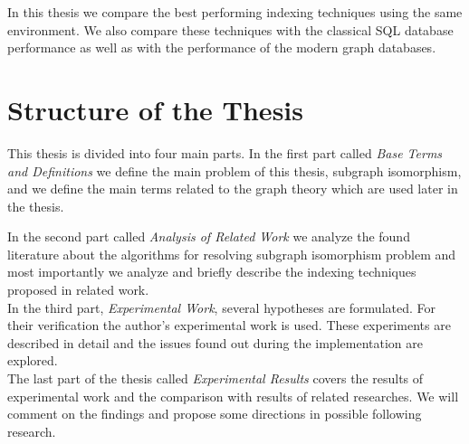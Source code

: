 In this thesis we compare the best performing indexing techniques using the same environment. We also compare these techniques with the classical SQL database performance as well as with the performance of the modern graph databases.


\section*{Structure of the Thesis}

This thesis is divided into four main parts. In the first part called \textit{Base Terms and Definitions} we define the main problem of this thesis, subgraph isomorphism, and we define the main terms related to the graph theory which are used later in the thesis.

In the second part called \textit{Analysis of Related Work} we analyze the found literature about the algorithms for resolving subgraph isomorphism problem and most importantly we analyze and briefly describe the indexing techniques proposed in related work.\\

In the third part, \textit{Experimental Work}, several hypotheses are formulated. For their verification the author’s experimental work is used. These experiments are described in detail and the issues found out during the implementation are explored.\\

The last part of the thesis called \textit{Experimental Results} covers the results of experimental work and the comparison with results of related researches. We will comment on the findings and propose some directions in possible following research.
